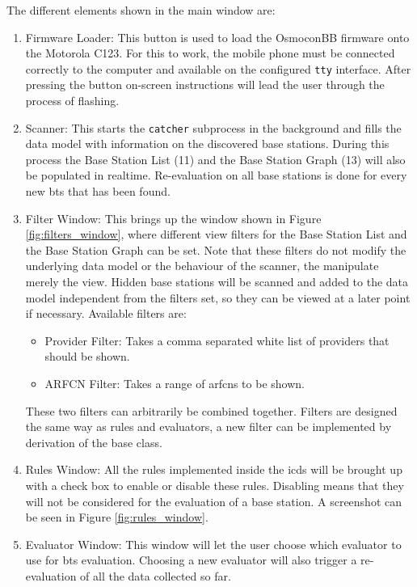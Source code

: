 The different elements shown in the main window are:
\begin{enumerate}
\item Firmware Loader: This button is used to load the OsmoconBB firmware onto the Motorola C123. 
For this to work, the mobile phone must be connected correctly to the computer and available on the configured \texttt{tty} interface.
After pressing the button on-screen instructions will lead the user through the process of flashing.

\item Scanner: This starts the \texttt{catcher} subprocess in the background and fills the data model with information on the discovered base stations.
During this process the Base Station List (11) and the Base Station Graph (13) will also be populated in realtime.
Re-evaluation on all base stations is done for every new \gls{bts} that has been found.

\item Filter Window: This brings up the window shown in Figure \ref{fig:filters_window}, where different view filters for the Base Station List and the Base Station Graph can be set.
Note that these filters do not modify the underlying data model or the behaviour of the scanner, the manipulate merely the view.
Hidden base stations will be scanned and added to the data model independent from the filters set, so they can be viewed at a later point if necessary.
Available filters are:
	\begin{itemize}
	\item Provider Filter: Takes a comma separated white list of providers that should be shown.
	\item ARFCN Filter: Takes a range of \glspl{arfcn} to be shown.
	\end{itemize}
These two filters can arbitrarily be combined together.
Filters are designed the same way as rules and evaluators, a new filter can be implemented by derivation of the base class.

\item Rules Window: All the rules implemented inside the \gls{icds} will be brought up with a check box to enable or disable these rules.
Disabling means that they will not be considered for the evaluation of a base station.
A screenshot can be seen in Figure \ref{fig:rules_window}.

\item Evaluator Window: This window will let the user choose  which evaluator to use for \gls{bts} evaluation.
Choosing a new evaluator will also trigger a re-evaluation of all the data collected so far.


\end{enumerate}
